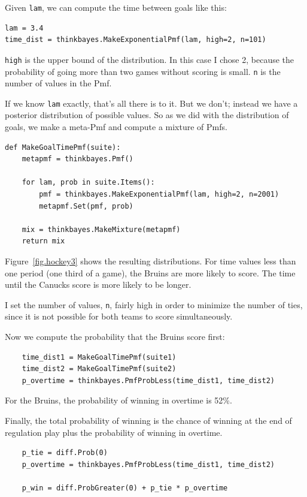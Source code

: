 \documentclass[12pt]{book}
\begin{document}
Given {\tt lam}, we can compute the time between goals like this: 

\begin{verbatim}
lam = 3.4
time_dist = thinkbayes.MakeExponentialPmf(lam, high=2, n=101)
\end{verbatim}  

{\tt high} is the upper bound of the distribution.  In this case
I chose 2, because the probability of going more than two games
without scoring is small.  {\tt n} is the number of values in
the Pmf.

If we know {\tt lam} exactly, that's all there is to it.
But we don't; instead we have a posterior
distribution of possible values.  So as we did with the distribution
of goals, we make a meta-Pmf and compute a mixture of
Pmfs.

\begin{verbatim}
def MakeGoalTimePmf(suite):
    metapmf = thinkbayes.Pmf()

    for lam, prob in suite.Items():
        pmf = thinkbayes.MakeExponentialPmf(lam, high=2, n=2001)
        metapmf.Set(pmf, prob)

    mix = thinkbayes.MakeMixture(metapmf)
    return mix
\end{verbatim}  

Figure~\ref{fig.hockey3} shows the resulting distributions.  For
time values less than one period (one third of a game), the Bruins
are more likely to score.  The time until the Canucks score is
more likely to be longer.

I set the number of values, {\tt n}, fairly high in order to minimize
the number of ties, since it is not possible for both teams
to score simultaneously.

Now we compute the probability that the Bruins score first:

\begin{verbatim}
    time_dist1 = MakeGoalTimePmf(suite1)
    time_dist2 = MakeGoalTimePmf(suite2)
    p_overtime = thinkbayes.PmfProbLess(time_dist1, time_dist2)
\end{verbatim}  

For the Bruins, the probability of winning in overtime is 52\%.

Finally, the total probability of winning is the chance of
winning at the end of regulation play plus the probability
of winning in overtime.

\begin{verbatim}
    p_tie = diff.Prob(0)
    p_overtime = thinkbayes.PmfProbLess(time_dist1, time_dist2)

    p_win = diff.ProbGreater(0) + p_tie * p_overtime
\end{verbatim}  
\end{document}
